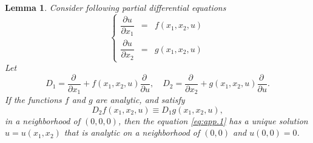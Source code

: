 \documentclass[preprint,12pt]{elsarticle}
\newtheorem{lem}[thm]{Lemma}
\begin{document}
\begin{lem}
\label{le:app}
Consider following partial differential equations
\begin{equation}
\label{eq:app.1}
\left\{
\begin{array}{rcl}
\dfrac{\partial u}{\partial x_1} &=& f(x_1,x_2,u)\\
\dfrac{\partial u}{\partial x_2} &=& g(x_1,x_2,u)
\end{array}
\right.
\end{equation}
Let
$$D_1 = \dfrac{\partial\ }{\partial x_1} + f(x_1,x_2,u)\dfrac{\partial\ }{\partial u},\quad D_2 = \dfrac{\partial\ }{\partial x_2} + g(x_1,x_2,u)\dfrac{\partial\ }{\partial u}.$$
If the functions $f$ and $g$ are analytic, and satisfy
\begin{equation}
\label{eq:DD}
D_2 f(x_1,x_2,u) \equiv D_1 g(x_1,x_2,u),
\end{equation}
in a neighborhood of $(0,0,0)$,  then the equation \eqref{eq:app.1} has a unique solution $u = u(x_1,x_2)$ that is analytic on a neighborhood of $(0,0)$ and $u(0,0) = 0$.
\end{lem}
\end{document}
